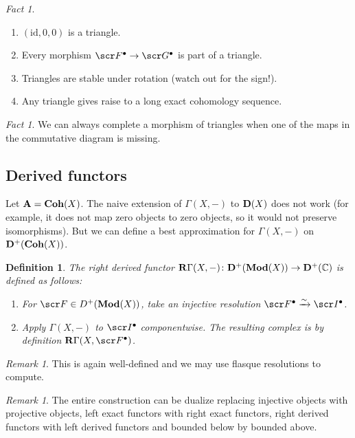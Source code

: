 \documentclass[A4paper, british, reqno]{amsart}
\theoremstyle{darkgreentheorem}
\theoremstyle{darkbluedefinition}
\newtheorem{defn}[thm]{Definition}
\theoremstyle{darkredexample}
\theoremstyle{remark}
\newtheorem{rem}[thm]{Remark}
\newtheorem{fact}[thm]{Fact}
\newcommand{\1}{\mathbbm{1}}
\newcommand{\id}{\mathrm{id}}
\newcommand{\grd}{^{\bullet}}
\begin{document}
\begin{fact}
    \begin{enumerate}
	\item $(\id,0,0)$ is a triangle.
	\item Every morphism $\F\grd\to \G\grd$ is part of a triangle.
	\item Triangles are stable under rotation (watch out for the sign!).
	\item Any triangle gives raise to a long exact cohomology sequence.
    \end{enumerate}
\end{fact}

\begin{fact}
    We can always complete a morphism of triangles when one of the maps in the commutative diagram is missing.
\end{fact}

\subsection{Derived functors}

Let $\mathbf{A}=\mathbf{Coh}(X)$.
The naive extension of $\Gamma(X,-)$ to $\mathbf{D}(X)$ does not work (for example, it does not map zero objects to zero objects, so it would not preserve isomorphisms).
But we can define a best approximation for $\Gamma(X,-)$ on $\mathbf{D}^{+}(\mathbf{Coh}(X))$.

\begin{defn}
    The \textit{right derived functor} $\mathbf{R}\Gamma(X,-)\colon \mathbf{D}^{+}(\mathbf{Mod}(X))\to \mathbf{D}^{+}(\mathbb{C})$ is defined as follows:
    \begin{enumerate}
	\item For $\F\in D^{+}(\Mod(X))$, take an injective resolution $\F\grd\xrightarrow{\sim}\I\grd$.
	\item Apply $\Gamma(X,-)$ to $\I\grd$ componentwise.
	    The resulting complex is by definition $\bfR\Gamma(X,\F\grd)$.
    \end{enumerate}
\end{defn}

\begin{rem}
    This is again well-defined and we may use flasque resolutions to compute.
\end{rem}

\begin{rem}
    The entire construction can be dualize replacing injective objects with projective objects, left exact functors with right exact functors, right derived functors with left derived functors and bounded below by bounded above.
\end{rem}
\end{document}
